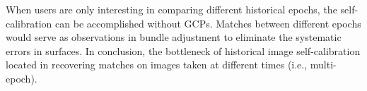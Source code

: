 When users are only interesting in comparing different historical epochs, the self-calibration can be accomplished without \ac{GCP}s. Matches between different epochs would serve as observations in bundle adjustment to eliminate the systematic errors in surfaces. In conclusion, the bottleneck of historical image self-calibration located in recovering matches on images taken at different times (i.e., multi-epoch).


